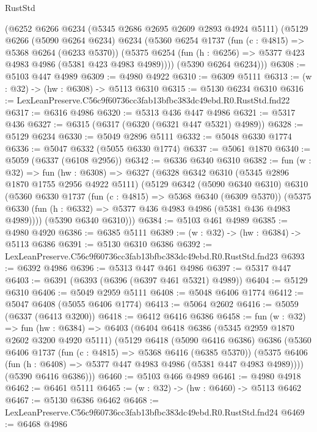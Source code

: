 \begin{lexlean}{RustStd}
\begin{coremodule}
    (@6252
      @6266
      @6234
      (@5345 @2686 @2695 @2609 @2893 @4924 @5111)
      (@5129
        @6266
        (@5090 @6264 @6234)
        @6234
        (@5360
          @6254
          @1737
          (fun (c : @4815) => @5368 @6264 (@6233 @5370))
          (@5375 @6254 (fun (h : @6256) => @5377 @423 @4983 @4986 (@5381 @423 @4983 @4989))))
        (@5390 @6264 @6234)))
@6308 := @5103 @447 @4989
@6309 := @4980 @4922
@6310 := @6309 @5111
@6313 := (w : @32) -> (hw : @6308) -> @5113 @6310
@6315 := @5130 @6234 @6310
@6316 := LexLeanPreserve.C56c9f60736cc3fab13bfbc383dc49ebd.R0.RustStd.fnd22
@6317 := @6316 @4986
@6320 := @5313 @436 @447 @4986
@6321 := @5317 @436
@6327 := @6315 (@6317 (@6320 (@6321 @447 @5321) @4989))
@6328 := @5129 @6234
@6330 := @5049 @2896 @5111
@6332 := @5048 @6330 @1774
@6336 := @5047 @6332 (@5055 @6330 @1774)
@6337 := @5061 @1870
@6340 := @5059 (@6337 (@6108 @2956))
@6342 := @6336 @6340 @6310
@6382 := fun (w : @32) =>
  fun (hw : @6308) =>
  @6327
    (@6328
      @6342
      @6310
      (@5345 @2896 @1870 @1755 @2956 @4922 @5111)
      (@5129
        @6342
        (@5090 @6340 @6310)
        @6310
        (@5360
          @6330
          @1737
          (fun (c : @4815) => @5368 @6340 (@6309 @5370))
          (@5375 @6330 (fun (h : @6332) => @5377 @436 @4983 @4986 (@5381 @436 @4983 @4989))))
        (@5390 @6340 @6310)))
@6384 := @5103 @461 @4989
@6385 := @4980 @4920
@6386 := @6385 @5111
@6389 := (w : @32) -> (hw : @6384) -> @5113 @6386
@6391 := @5130 @6310 @6386
@6392 := LexLeanPreserve.C56c9f60736cc3fab13bfbc383dc49ebd.R0.RustStd.fnd23
@6393 := @6392 @4986
@6396 := @5313 @447 @461 @4986
@6397 := @5317 @447
@6403 := @6391 (@6393 (@6396 (@6397 @461 @5321) @4989))
@6404 := @5129 @6310
@6406 := @5049 @2959 @5111
@6408 := @5048 @6406 @1774
@6412 := @5047 @6408 (@5055 @6406 @1774)
@6413 := @5064 @2602
@6416 := @5059 (@6337 (@6413 @3200))
@6418 := @6412 @6416 @6386
@6458 := fun (w : @32) =>
  fun (hw : @6384) =>
  @6403
    (@6404
      @6418
      @6386
      (@5345 @2959 @1870 @2602 @3200 @4920 @5111)
      (@5129
        @6418
        (@5090 @6416 @6386)
        @6386
        (@5360
          @6406
          @1737
          (fun (c : @4815) => @5368 @6416 (@6385 @5370))
          (@5375 @6406 (fun (h : @6408) => @5377 @447 @4983 @4986 (@5381 @447 @4983 @4989))))
        (@5390 @6416 @6386)))
@6460 := @5103 @466 @4989
@6461 := @4980 @4918
@6462 := @6461 @5111
@6465 := (w : @32) -> (hw : @6460) -> @5113 @6462
@6467 := @5130 @6386 @6462
@6468 := LexLeanPreserve.C56c9f60736cc3fab13bfbc383dc49ebd.R0.RustStd.fnd24
@6469 := @6468 @4986

\end{coremodule}
\end{lexlean}
